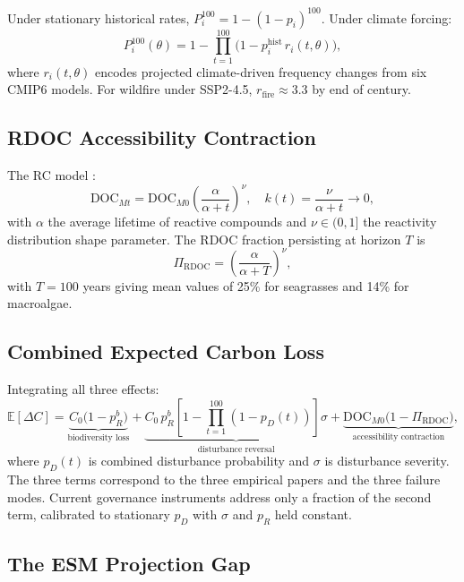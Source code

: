 \documentclass[12pt]{article}
\newcommand{\E}{\mathbb{E}}
\begin{document}
Under stationary historical rates, $P_i^{100}=1-(1-p_i)^{100}$. Under climate forcing:
\begin{equation}
\label{eq:reversal-prob}
P_i^{100}(\theta) = 1-\prod_{t=1}^{100}\bigl(1-p_i^{\text{hist}}\,r_i(t,\theta)\bigr),
\end{equation}
where $r_i(t,\theta)$ encodes projected climate-driven frequency changes from six CMIP6
models. For wildfire under SSP2-4.5, $r_\text{fire} \approx 3.3$ by end of century.

\subsection{RDOC Accessibility Contraction}

The RC model \citep{Watanabe2026}:
\begin{equation}
\label{eq:rc-model}
\text{DOC}_{Mt} = \text{DOC}_{M0}\left(\frac{\alpha}{\alpha+t}\right)^\nu,
\quad k(t) = \frac{\nu}{\alpha+t} \to 0,
\end{equation}
with $\alpha$ the average lifetime of reactive compounds and $\nu\in(0,1]$ the reactivity
distribution shape parameter. The RDOC fraction persisting at horizon $T$ is
\begin{equation}
\label{eq:rdoc-fraction}
\Pi_\text{RDOC} = \left(\frac{\alpha}{\alpha+T}\right)^\nu,
\end{equation}
with $T=100$ years giving mean values of 25\% for seagrasses and 14\% for macroalgae.

\subsection{Combined Expected Carbon Loss}

Integrating all three effects:
\begin{equation}
\label{eq:combined}
\E[\Delta C]
= \underbrace{C_0\bigl(1-p_R^b\bigr)}_{\text{biodiversity loss}}
+ \underbrace{C_0\,p_R^b\!\left[1-\prod_{t=1}^{100}(1-p_D(t))\right]\sigma}_{\text{disturbance reversal}}
+ \underbrace{\text{DOC}_{M0}\bigl(1-\Pi_\text{RDOC}\bigr)}_{\text{accessibility contraction}},
\end{equation}
where $p_D(t)$ is combined disturbance probability and $\sigma$ is disturbance severity.
The three terms correspond to the three empirical papers and the three failure modes.
Current governance instruments address only a fraction of the second term, calibrated to
stationary $p_D$ with $\sigma$ and $p_R$ held constant.

\subsection{The ESM Projection Gap}
\end{document}
